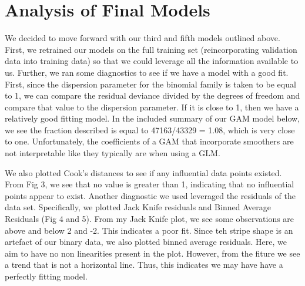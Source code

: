 \documentclass[11pt, oneside]{article}   	%
\begin{document}
\section*{Analysis of Final Models}
We decided to move forward with our third and fifth models outlined above. First, we retrained our models on the full training set (reincorporating validation data into training data) so that we could leverage all the information available to us. Further, we ran some diagnostics to see if we have a model with a good fit. First, since the dispersion parameter for the binomial family is taken to be equal to 1, we can compare the residual deviance divided by the degrees of freedom and compare that value to the dispersion parameter. If it is close to 1, then we have a relatively good fitting model. In the included summary of our GAM model below, we see the fraction described is equal to 47163/43329 = 1.08, which is very close to one. Unfortunately, the coefficients of a GAM that incorporate smoothers are not interpretable like they typically are when using a GLM. 

We also plotted Cook's distances to see if any influential data points existed. From Fig 3, we see that no value is greater than 1, indicating that no influential points appear to exist. Another diagnostic we used leveraged the residuals of the data set. Specifically, we plotted Jack Knife residuals and Binned Average Residuals (Fig 4 and 5). From my Jack Knife plot, we see some observations are above and below 2 and -2. This indicates a poor fit. Since teh stripe shape is an artefact of our binary data, we also plotted binned average residuals. Here, we aim to have no non linearities present in the plot. However, from the fiture we see a trend that is not a horizontal line. Thus, this indicates we may have have a perfectly fitting model. 


\end{document}
